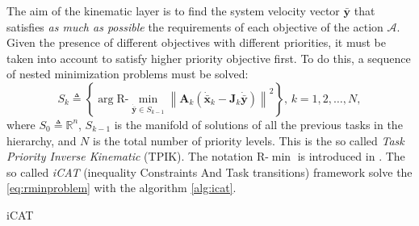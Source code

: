 The aim of the kinematic layer is to find the system velocity vector $\boldsymbol{\bar{y}}$ that satisfies \textit{as much as possible} the requirements of each objective of the action $\mathcal{A}$. Given the presence of different objectives with different priorities, it must be taken into account to satisfy higher priority objective first. To do this, a sequence of nested minimization problems must be solved: 
\begin{equation}\label{eq:rminproblem}
S_k \triangleq \left\{ \arg \mathrm{R\textrm{-}}\min_{\dot{\bar{\boldsymbol{y}}} \in S_{k-1}} \left\| \boldsymbol{A}_k (\dot{\bar{\boldsymbol{x}}}_k - \boldsymbol{J}_k \dot{\bar{\boldsymbol{y}}}) \right\|^2 \right\},\, k = 1, 2, \ldots, N,
\end{equation}
where $S_0 \triangleq \mathbb{R}^n$, $S_{k-1}$ is the manifold of solutions of all the previous tasks in the hierarchy, and $N$ is the total number of priority levels. This is the so called \textit{Task Priority Inverse Kinematic} (TPIK). The notation $\mathrm{R\textrm{-}}\min$ is introduced in \cite{IntroMaris1}. The so called \textit{iCAT} (inequality Constraints And Task transitions) framework solve the \eqref{eq:rminproblem} with the algorithm \ref{alg:icat}.\\
\begin{algorithm}[H]
	\caption{iCAT} \label{alg:icat}
	\begin{algorithmic} [1] {\large
		\vspace{5px}
		\vspace{5px}
				\vspace{5px}
		\vspace{5px}
		\vspace{5px}
		\ENDFOR 
		\vspace{5px}
		}
	\end{algorithmic}
\end{algorithm}


